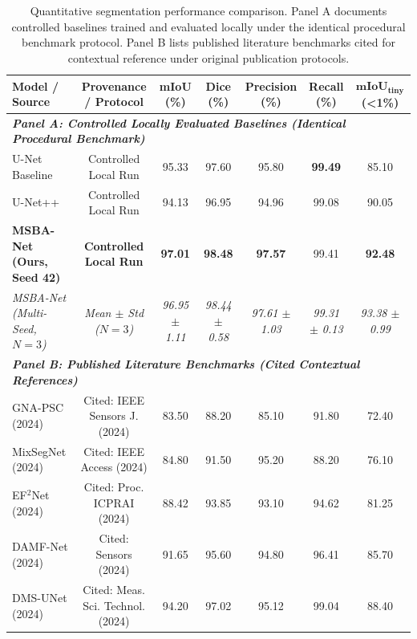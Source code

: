 \documentclass{ieeeaccess}
\begin{document}
\begin{table}[!t]
\centering
\setlength{\tabcolsep}{3pt}
\fontsize{7.8pt}{9.8pt}\selectfont
\caption{Quantitative segmentation performance comparison. Panel A documents controlled baselines trained and evaluated locally under the identical procedural benchmark protocol. Panel B lists published literature benchmarks cited for contextual reference under original publication protocols.}
\label{tab:benchmark}
\begin{tabular*}{\textwidth}{@{\extracolsep{\fill}}lcccccc@{}}
\toprule
\textbf{Model / Source} & \textbf{Provenance / Protocol} & \textbf{mIoU (\%)} & \textbf{Dice (\%)} & \textbf{Precision (\%)} & \textbf{Recall (\%)} & $\mathbf{mIoU}_{\mathbf{tiny}}$ \textbf{(<1\%)} \\
\midrule
\multicolumn{7}{l}{\textit{\textbf{Panel A: Controlled Locally Evaluated Baselines (Identical Procedural Benchmark)}}} \\
U-Net Baseline \cite{song2013neu} & Controlled Local Run & 95.33 & 97.60 & 95.80 & \textbf{99.49} & 85.10 \\
U-Net++ \cite{zhou2024mixsegnet} & Controlled Local Run & 94.13 & 96.95 & 94.96 & 99.08 & 90.05 \\
\textbf{MSBA-Net (Ours, Seed 42)} & \textbf{Controlled Local Run} & \textbf{97.01} & \textbf{98.48} & \textbf{97.57} & 99.41 & \textbf{92.48} \\
\textit{MSBA-Net (Multi-Seed, $N=3$)} & \textit{Mean $\pm$ Std ($N=3$)} & \textit{96.95 $\pm$ 1.11} & \textit{98.44 $\pm$ 0.58} & \textit{97.61 $\pm$ 1.03} & \textit{99.31 $\pm$ 0.13} & \textit{93.38 $\pm$ 0.99} \\
\midrule
\multicolumn{7}{l}{\textit{\textbf{Panel B: Published Literature Benchmarks (Cited Contextual References)}}} \\
GNA-PSC (2024) \cite{zhang2024gnapsc} & Cited: IEEE Sensors J. (2024) & 83.50 & 88.20 & 85.10 & 91.80 & 72.40 \\
MixSegNet (2024) \cite{zhou2024mixsegnet} & Cited: IEEE Access (2024) & 84.80 & 91.50 & 95.20 & 88.20 & 76.10 \\
EF$^2$Net (2024) \cite{li2024ef2net} & Cited: Proc. ICPRAI (2024) & 88.42 & 93.85 & 93.10 & 94.62 & 81.25 \\
DAMF-Net (2024) \cite{liu2024damfnet} & Cited: Sensors (2024) & 91.65 & 95.60 & 94.80 & 96.41 & 85.70 \\
DMS-UNet (2024) \cite{liu2024dmsunet} & Cited: Meas. Sci. Technol. (2024) & 94.20 & 97.02 & 95.12 & 99.04 & 88.40 \\
\bottomrule
\end{tabular*}
\end{table}
\end{document}
